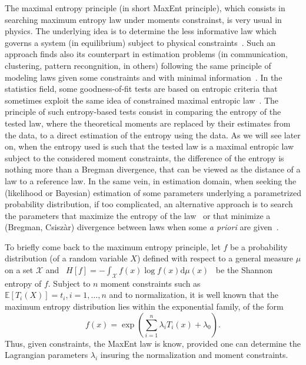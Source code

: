 \documentclass[english,sort&compress]{elsarticle}
\theoremstyle{definition}
\theoremstyle{plain}
\theoremstyle{plain}
\def\dmu{\mathrm{d}\mu}
\def\X{\mathcal{X}}
\newcommand{\Esp}[1]{\mathbb{E}\left[ #1 \right]}
\begin{document}
The maximal  entropy principle  (in short MaxEnt  principle), which  consists in
searching  maximum entropy  law  under  moments constrainst,  is  very usual  in
physics.  The  underlying idea  is to determine  the less informative  law which
governs a  system (in equilibrium) subject  to physical constraints~\cite{Jay57,
  Kap89,  Arn01, CovTho06}.   Such an  approach  finds also  its counterpart  in
estimation  problems  (in communication,  clustering,  pattern recongnition,  in
others) following the same principle of modeling laws given some constraints and
with  minimal information~\cite{JonByr90,  Arn01, HerMa02}.   In  the statistics
field, some goodness-of-fit tests are  based on entropic criteria that sometimes
exploit the  same idea of  constrained maximal entropic  law~\cite{Vas76, Gok83,
  Son02,  Leq14, Leq15, GirReg15}.   The principle  of such  entropy-based tests
consist  in comparing  the  entropy of  the  tested law,  where the  theoretical
moments are replaced by their estimates from the data, to a direct estimation of
the entropy using  the data. As we will  see later on, when the  entropy used is
such that  the tested law  is a maximal  entropic law subject to  the considered
moment constraints, the difference of the entropy is nothing more than a Bregman
divergence, that can be viewed as the  distance of a law to a reference law.  In
the same vein,  in estimation domain, when seeking  the (likelihood or Bayesian)
estimation   of   some   parameters   underlying  a   parametrized   probability
distribution,  if too  complicated, an  alternative  approach is  to search  the
parameters  that maximize  the entropy  of the  law~\cite{Jay68, Jay82}  or that
minimize a (Bregman, Csisz\`ar) divergence between laws when some {\em a priori}
are given~\cite{Csi91, Bas13, FriSri08}.

To briefly come back to the  maximum entropy principle, let $f$ be a probability
distribution  (of a  random  variable $X$)  defined  with respect  to a  general
measure $\mu$ on a set $\X$ and \ $\displaystyle H[f] = - \int_\X f(x) \log f(x)
\dmu(x)$ \  be the Shannon  entropy of $f$.   Subject to $n$  moment constraints
such as  $\Esp{T_i(X)} = t_i, i  = 1 , \ldots  , n$ and to  normalization, it is
well known  that the  maximum entropy distribution  lies within  the exponential
family, of the form~\cite{Kap89, BorLew91:05, CovTho06, Arn01}
%
\[
f(x) = \exp\left( \sum_{i=1}^n \lambda_i T_i(x) + \lambda_0 \right).
\]
%
Thus, given constraints, the MaxEnt law  is know, provided one can determine the
Lagrangian  parameters   $\lambda_i$  insuring  the   normalization  and  moment
constraints.
\end{document}
